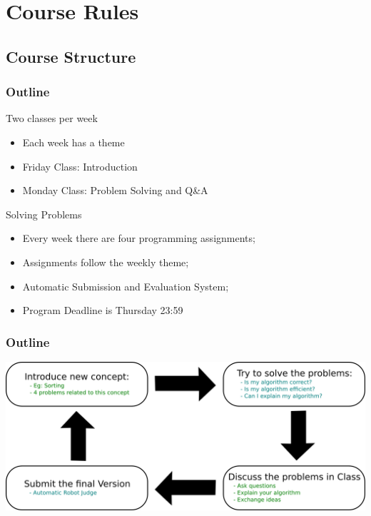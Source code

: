 \documentclass{beamer}
\begin{document}
\section{Course Rules}
\subsection{Course Structure}

\begin{frame}
    \frametitle{Outline}
    
    \begin{block}{Two classes per week}
        \begin{itemize}   
        \item Each week has a theme
        \item Friday Class: Introduction
        \item Monday Class: Problem Solving and Q\&A
        \end{itemize}
    \end{block}
    
    \begin{block}{Solving Problems}
        \begin{itemize}
        \item Every week there are four programming assignments;
        \item Assignments follow the weekly theme;
        \item Automatic Submission and Evaluation System;
        \item Program Deadline is Thursday 23:59
        \end{itemize}   
    \end{block}
\end{frame}
    
\begin{frame}
  \frametitle{Outline}
  \begin{center}
    \includegraphics[width=1\textwidth]{../img/classoutline}
  \end{center}
\end{frame}
\end{document}
